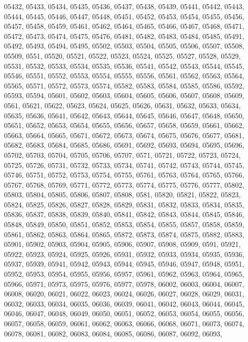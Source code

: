 {05432,
05433,
05434,
05435,
05436,
05437,
05438,
05439,
05441,
05442,
05443,
05444,
05445,
05446,
05447,
05448,
05451,
05452,
05453,
05454,
05455,
05456,
05457,
05458,
05459,
05461,
05462,
05464,
05465,
05466,
05467,
05468,
05471,
05472,
05473,
05474,
05475,
05476,
05481,
05482,
05483,
05484,
05485,
05491,
05492,
05493,
05494,
05495,
05502,
05503,
05504,
05505,
05506,
05507,
05508,
05509,
0551,
05520,
05521,
05522,
05523,
05524,
05525,
05527,
05528,
05529,
05531,
05532,
05533,
05534,
05535,
05536,
05541,
05542,
05543,
05544,
05545,
05546,
05551,
05552,
05553,
05554,
05555,
05556,
05561,
05562,
05563,
05564,
05565,
05571,
05572,
05573,
05574,
05582,
05583,
05584,
05585,
05586,
05592,
05593,
05594,
05601,
05602,
05603,
05604,
05605,
05606,
05607,
05608,
05609,
0561,
05621,
05622,
05623,
05624,
05625,
05626,
05631,
05632,
05633,
05634,
05635,
05636,
05641,
05642,
05643,
05644,
05645,
05646,
05647,
05648,
05650,
05651,
05652,
05653,
05654,
05655,
05656,
05657,
05658,
05659,
05661,
05662,
05663,
05664,
05665,
05671,
05672,
05673,
05674,
05675,
05676,
05677,
05681,
05682,
05683,
05684,
05685,
05686,
05691,
05692,
05693,
05694,
05695,
05696,
05702,
05703,
05704,
05705,
05706,
05707,
0571,
05721,
05722,
05723,
05724,
05725,
05726,
05731,
05732,
05733,
05734,
05741,
05742,
05743,
05744,
05745,
05746,
05751,
05752,
05753,
05754,
05755,
05761,
05763,
05764,
05765,
05766,
05767,
05768,
05769,
05771,
05772,
05773,
05774,
05775,
05776,
05777,
05802,
05803,
05804,
05805,
05806,
05807,
05808,
0581,
05820,
05821,
05822,
05823,
05824,
05825,
05826,
05827,
05828,
05829,
05831,
05832,
05833,
05834,
05835,
05836,
05837,
05838,
05839,
05840,
05841,
05842,
05843,
05844,
05845,
05846,
05848,
05849,
05850,
05851,
05852,
05853,
05854,
05855,
05857,
05858,
05859,
05861,
05862,
05863,
05864,
05865,
05872,
05873,
05874,
05875,
05882,
05883,
05901,
05902,
05903,
05904,
05905,
05906,
05907,
05908,
05909,
0591,
05921,
05922,
05923,
05924,
05925,
05926,
05931,
05932,
05933,
05934,
05935,
05936,
05937,
05939,
05941,
05942,
05943,
05944,
05945,
05946,
05947,
05948,
05951,
05952,
05953,
05954,
05955,
05956,
05957,
05961,
05962,
05963,
05964,
05965,
05966,
05971,
05973,
05975,
05976,
05977,
05978,
06002,
06003,
06004,
06007,
06008,
06020,
06021,
06022,
06023,
06024,
06026,
06027,
06028,
06029,
06031,
06032,
06033,
06034,
06035,
06036,
06039,
06041,
06042,
06043,
06044,
06045,
06046,
06047,
06048,
06049,
06050,
06051,
06052,
06053,
06054,
06055,
06056,
06057,
06058,
06059,
06061,
06062,
06063,
06066,
06068,
06071,
06073,
06074,
06078,
06081,
06082,
06083,
06084,
06085,
06086,
06087,
06092,
06093,
}
